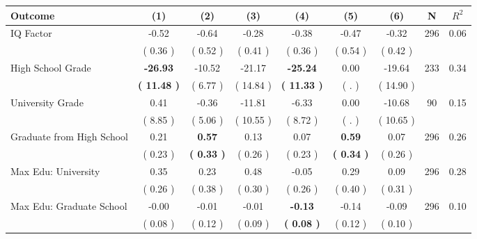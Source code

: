 \begin{tabular}{lcccccccc}
\toprule
 \textbf{Outcome} & \textbf{(1)} & \textbf{(2)} & \textbf{(3)} & \textbf{(4)} & \textbf{(5)} & \textbf{(6)} & \textbf{N} & \textbf{$ R^2$} \\
\midrule
IQ Factor &     -0.52 &     -0.64 &     -0.28 &     -0.38 &     -0.47 &     -0.32 & 296 &       0.06 \\ 
 & (     0.36 ) & (     0.52 ) & (     0.41 ) & (     0.36 ) & (     0.54 ) & (     0.42 ) & \\
High School Grade & \textbf{   -26.93} &    -10.52 &    -21.17 & \textbf{   -25.24} &      0.00 &    -19.64 & 233 &       0.34 \\ 
 & \textbf{(    11.48 )} & (     6.77 ) & (    14.84 ) & \textbf{(    11.33 )} & (        . ) & (    14.90 ) & \\
University Grade &      0.41 &     -0.36 &    -11.81 &     -6.33 &      0.00 &    -10.68 & 90 &       0.15 \\ 
 & (     8.85 ) & (     5.06 ) & (    10.55 ) & (     8.72 ) & (        . ) & (    10.65 ) & \\
Graduate from High School &      0.21 & \textbf{     0.57} &      0.13 &      0.07 & \textbf{     0.59} &      0.07 & 296 &       0.26 \\ 
 & (     0.23 ) & \textbf{(     0.33 )} & (     0.26 ) & (     0.23 ) & \textbf{(     0.34 )} & (     0.26 ) & \\
Max Edu: University &      0.35 &      0.23 &      0.48 &     -0.05 &      0.29 &      0.09 & 296 &       0.28 \\ 
 & (     0.26 ) & (     0.38 ) & (     0.30 ) & (     0.26 ) & (     0.40 ) & (     0.31 ) & \\
Max Edu: Graduate School &     -0.00 &     -0.01 &     -0.01 & \textbf{    -0.13} &     -0.14 &     -0.09 & 296 &       0.10 \\ 
 & (     0.08 ) & (     0.12 ) & (     0.09 ) & \textbf{(     0.08 )} & (     0.12 ) & (     0.10 ) & \\
\bottomrule
\end{tabular}
